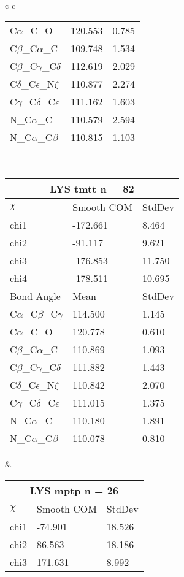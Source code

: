 \begin{longtable}{ c c }
\begin{tabular}{ l l l }
  C$\alpha$\_C\_O & 120.553 & 0.785\\
  C$\beta$\_C$\alpha$\_C & 109.748 & 1.534\\
  C$\beta$\_C$\gamma$\_C$\delta$ & 112.619 & 2.029\\
  C$\delta$\_C$\epsilon$\_N$\zeta$ & 110.877 & 2.274\\
  C$\gamma$\_C$\delta$\_C$\epsilon$ & 111.162 & 1.603\\
  N\_C$\alpha$\_C & 110.579 & 2.594\\
  N\_C$\alpha$\_C$\beta$ & 110.815 & 1.103\\
  \bottomrule
  \end{tabular}
  \\
  \begin{tabular}{ l l l }
  \toprule
  \multicolumn{3}{c}{LYS \textbf{tmtt} n = 82} \\ \toprule
  $\chi$       & Smooth COM & StdDev \\ \midrule
  chi1 & -172.661 & 8.464 \\ 
  chi2 & -91.117 & 9.621 \\ 
  chi3 & -176.853 & 11.750 \\ 
  chi4 & -178.511 & 10.695 \\ \midrule
  Bond Angle   & Mean     & StdDev \\ \midrule
  C$\alpha$\_C$\beta$\_C$\gamma$ & 114.500 & 1.145\\
  C$\alpha$\_C\_O & 120.778 & 0.610\\
  C$\beta$\_C$\alpha$\_C & 110.869 & 1.093\\
  C$\beta$\_C$\gamma$\_C$\delta$ & 111.882 & 1.443\\
  C$\delta$\_C$\epsilon$\_N$\zeta$ & 110.842 & 2.070\\
  C$\gamma$\_C$\delta$\_C$\epsilon$ & 111.015 & 1.375\\
  N\_C$\alpha$\_C & 110.180 & 1.891\\
  N\_C$\alpha$\_C$\beta$ & 110.078 & 0.810\\
  \bottomrule
  \end{tabular}
  &
  \begin{tabular}{ l l l }
  \toprule
  \multicolumn{3}{c}{LYS \textbf{mptp} n = 26} \\ \toprule
  $\chi$       & Smooth COM & StdDev \\ \midrule
  chi1 & -74.901 & 18.526 \\ 
  chi2 & 86.563 & 18.186 \\ 
  chi3 & 171.631 & 8.992 \\ 

\end{tabular}
\end{longtable}
